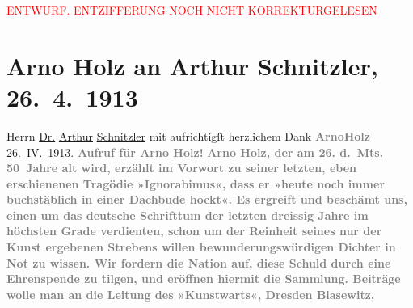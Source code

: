 
\begin{center}
            \textcolor{red}{ENTWURF. ENTZIFFERUNG NOCH NICHT KORREKTURGELESEN}
                      \end{center}
            
               \section[Arno Holz an Arthur Schnitzler, 26. 4. 1913]{ Arno Holz an Arthur Schnitzler, 26. 4. 1913}\nopagebreak{}\rehead{ }\begin{ledgroupsized}[t]{13cm}\normalsize\beginnumbering{} \toendnotes[C]{\smallbreak\pagebreak[2]} 
\pstart
           \noindent{}{\pb}Herrn\pend
           \pstart
           \uline{Dr.}{ }\uline{Arthur}{ }\uline{Schnitzler}\pend
           \pstart
           mit aufrichtigſt herzlichem Dank\pend
           \pstart
           \centering{}\textcolor{gray}{\textbf{ArnoHolz}}\pend
           \pstart
           \noindent{}\centering{}26. IV. 1913.\pend
           \pstart
           \noindent{}\centering{}{\pb}\textcolor{gray}{\textbf{Aufruf für Arno Holz!}}\pend
           \pstart
           \noindent{}\textcolor{gray}{\textbf{Arno Holz, der am 26. d. Mts. 50 Jahre alt
                        wird, erzählt im Vorwort zu seiner letzten, eben erschienenen Tragödie »Ignorabimus«, dass er »heute noch immer
                        buchstäblich in einer Dachbude hockt«. Es ergreift und beschämt uns, einen
                        um das deutsche Schrifttum der letzten dreissig Jahre im höchsten Grade
                        verdienten, schon um der Reinheit seines nur der Kunst ergebenen Strebens
                        willen bewunderungswürdigen Dichter in Not zu wissen. Wir fordern die Nation
                        auf, diese Schuld durch eine Ehrenspende zu tilgen, und eröffnen hiermit die
                        Sammlung. Beiträge wolle man an die Leitung des »Kunstwarts«, Dresden Blasewitz,
}}
\end{ledgroupsized}
